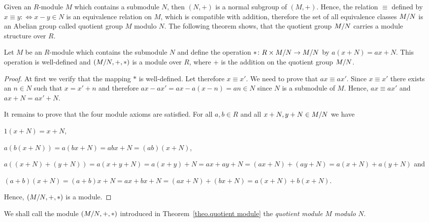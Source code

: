 Given an $R$-module $M$ which contains a submodule $N$, then $(N,+)$ is a normal subgroup of $(M,+)$. Hence, the relation $\equiv$ defined by $x\equiv y:\Leftrightarrow x-y\in N$ is an equivalence relation on $M$, which is compatible with addition, therefore the set of all equivalence classes $M/N$ is an Abelian group called quotient group $M$ modulo $N$. The following theorem shows, that the quotient group $M/N$ carries a module structure over $R$.

\begin{thm} \label{theo.quotient module}
Let $M$ be an $R$-module which contains the submodule $N$ and define the operation $\ast\colon R\times M/N\rightarrow M/N$ by $a(x+N)=ax+N$. This operation is well-defined and $(M/N,+,\ast)$ is a module over $R$, where + is the addition on the quotient group $M/N$.
\end{thm}

\begin{proof}
At first we verify that the mapping $\ast$ is well-defined. Let therefore $x\equiv x'$. We need to prove that $ax\equiv ax'$. Since $x\equiv x'$ there exists an $n\in N$ such that $x=x'+n$ and therefore $ax-ax'=ax-a(x-n)=an\in N$ since $N$ is a submodule of $M$. Hence, $ax\equiv ax'$ and $ax+N=ax'+N$. 

It remains to prove that the four module axioms are satisfied. For all $a,b\in R$ and all $x+N,y+N\in M/N$ we have
\begin{exlist}
\item $1(x+N)=x+N$,
\item $a(b(x+N))=a(bx+N)=abx+N=(ab)(x+N)$,
\item $a((x+N)+(y+N))=a(x+y+N)=a(x+y)+N=ax+ay+N=(ax+N)+(ay+N)=a(x+N)+a(y+N)$ and
\item $(a+b)(x+N)=(a+b)x+N=ax+bx+N=(ax+N)+(bx+N)=a(x+N)+b(x+N)$.
\end{exlist}
Hence, $(M/N,+,\ast)$ is a module.
\end{proof}

\begin{defin}
We shall call the module $(M/N,+,\ast)$ introduced in Theorem~\ref{theo.quotient module} the \emph{quotient module $M$ modulo $N$}.
\end{defin}

